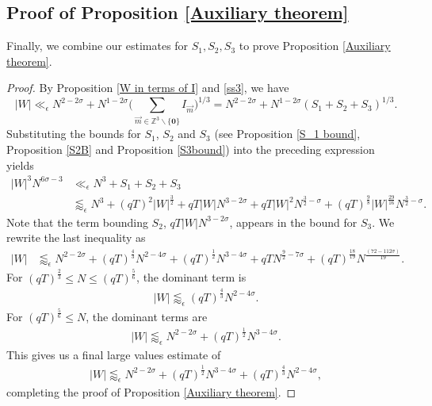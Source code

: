 \documentclass[12pt]{amsart}
\theoremstyle{definition}
\theoremstyle{plain}
\theoremstyle{remark}
\numberwithin{equation}{section}
\numberwithin{theorem}{section}
\numberwithin{equation}{section}
\begin{document}
	\subsection{Proof of Proposition \ref{Auxiliary theorem}}\label{Pofmaipro2}
	Finally, we combine our estimates for $S_1,S_2,S_3$ to prove Proposition \ref{Auxiliary theorem}. 
	\begin{proof}
		By Proposition \ref{W in terms of I} and \eqref{ss3}, we have
		\[
		|W| \ll_{\epsilon} N^{2-2\sigma}+N^{1-2\sigma}\bigg( \sum_{\overrightarrow{m}\in \mathbb{Z}^{3} \backslash \{\mathbf{0}\}}I_{\overrightarrow{m}} \bigg)^{1/3}=N^{2-2\sigma}+N^{1-2\sigma}( S_{1}+S_{2}+S_{3})^{1/3}.
		\]
		Substituting the bounds for $S_{1}$, $S_{2}$ and $S_{3}$ (see Proposition \ref{S_1 bound}, Proposition \ref{S2B} and  Proposition \ref{S3bound}) into the preceding expression yields
		\begin{align*}
			|W|^{3}N^{6\sigma-3} &\ll_{\epsilon} N^{3}+S_{1}+S_{2}+S_{3}
			\\
			&\lessapprox_{\epsilon} N^3 + (qT)^2|W|^{\frac{3}{2}} +qT|W|N^{3-2\sigma} + qT|W|^2 N^{\frac{3}{2}-\sigma}+(qT)^{\frac{9}{8}}|W|^{\frac{29}{16}}N^{\frac{3}{2}-\sigma}.
		\end{align*} 
		Note that the term bounding $S_2$, $qT|W|N^{3-2\sigma}$, appears in the bound for $S_3$. We rewrite the last inequality as 
		\begin{align*}
			|W| &\lessapprox_{\epsilon} N^{2-2\sigma} + (qT)^{\frac{4}{3}}N^{2-4\sigma}+(qT)^{\frac{1}{2}}N^{3-4\sigma}+qTN^{\frac{9}{2}-7\sigma}
			+(qT)^{\frac{18}{19}}N^{\frac{(72-112 \sigma)}{19}}.\label{New eqn 12.1}
		\end{align*}
		For $(qT)^{\frac{2}{3}} \leq N \leq (qT)^{\frac{5}{6}}$, the dominant term is 
		\begin{align*}
			|W| \lessapprox_{\epsilon} (qT)^{\frac{4}{3}}N^{2-4\sigma}.
		\end{align*}
		For $(qT)^{\frac{5}{6}} \leq N$, the dominant terms are
		\begin{align*}
			|W| \lessapprox_{\epsilon} N^{2-2\sigma}+(qT)^{\frac{1}{2}}N^{3-4\sigma}.
		\end{align*}
		This gives us a final large values estimate of 
		\begin{align*}
			|W| \lessapprox_{\epsilon} N^{2-2\sigma}+(qT)^{\frac{1}{2}}N^{3-4\sigma} +(qT)^{\frac{4}{3}}N^{2-4\sigma},
		\end{align*}
		completing the proof of Proposition \ref{Auxiliary theorem}. 
	\end{proof}
\end{document}
